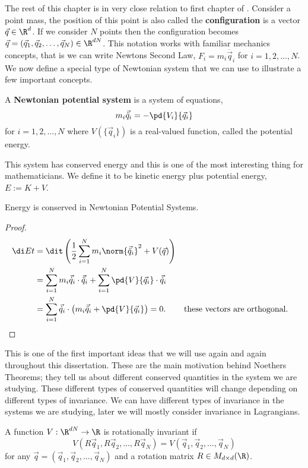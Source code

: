 \noindent
The rest of this chapter is in very close relation to first chapter of \cite{holm_schmah_stoica_2009}. Consider a point mass, the position of this point is also called the \textbf{configuration} is a vector $\vec q \in \R^d$. If we consider $N$ points then the configuration becomes $\vec q = (\vec q_1, \vec q_2, \dots, \vec q_N) \in \R^{dN}$. This notation works with familiar mechanics concepts, that is we can write Newtons Second Law, $F_i = m_i\ddot{\vec q_i}$ for $i = 1, 2, \dots, N$.
We now define a special type of Newtonian system that we can use to illustrate a few important concepts.

\begin{ndefi}
  A \textbf{Newtonian potential system} is a system of equations,
  $$ m_i\vec{\ddot q}_i = -\pd{V_i}{\vec q_i} $$
  for $i = 1, 2, \dots, N$ where $V(\{\vec q_i\})$ is a real-valued function, called the potential energy.
\end{ndefi}
\noindent
This system has conserved energy and this is one of the most interesting thing for mathematicians. We define it to be kinetic energy plus potential energy, $E := K + V$.
\begin{nthm}
  Energy is conserved in Newtonian Potential Systems.
\end{nthm}
\begin{proof}
  \begin{align*}
    \di E t &= \dit \left( \frac{1}{2}\sum_{i=1}^N m_i\norm{\vec{\ddot q}_i}^2 + V(\vec q) \right)\\
    &= \sum_{i=1}^N m_i \vec{\dot q}_i \cdot \vec{\ddot q}_i + \sum_{i=1}^N \pd{V}{\vec q_i} \cdot \vec{\dot q}_i\\
    &= \sum_{i=1}^N \vec{\dot q}_i \cdot \left( m_i \vec{\ddot q}_i + \pd{V}{\vec q_i} \right) = 0. && \text{these vectors are orthogonal.}
  \end{align*}
\end{proof}

\noindent
This is one of the first important ideas that we will use again and again throughout this dissertation. These are the main motivation behind Noethers Theorems; they tell us about different conserved quantities in the system we are studying. These different types of conserved quantities will change depending on different types of invariance. We can have different types of invariance in the systems we are studying, later we will mostly consider invariance in Lagrangians.
\begin{ndefi}
  A function $V : \R^{dN} \to \R$ is rotationally invariant if
  $$ V(R\vec q_1, R\vec q_2, \dots, R\vec q_N) = V(\vec q_1, \vec q_2, \dots, \vec q_N) $$
  for any $\vec q = (\vec q_1, \vec q_2, \dots, \vec q_N)$ and a rotation matrix $R \in M_{d \times d}(\R)$.
\end{ndefi}

